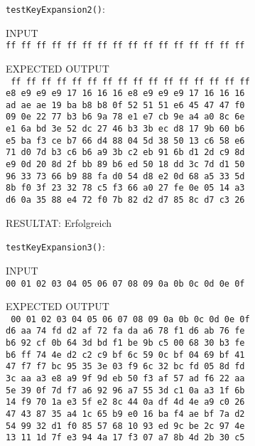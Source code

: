 \documentclass[12pt, letterpaper]{article}
\newcommand{\code}[1]{\texttt{#1}}
\begin{document}
\newpage
\code{testKeyExpansion2()}:

INPUT\\
\code{ff ff ff ff ff ff ff ff ff ff ff ff ff ff ff ff}

EXPECTED OUTPUT\\
\code{
ff ff ff ff ff ff ff ff ff ff ff ff ff ff ff ff\\
e8 e9 e9 e9 17 16 16 16 e8 e9 e9 e9 17 16 16 16\\
ad ae ae 19 ba b8 b8 0f 52 51 51 e6 45 47 47 f0\\
09 0e 22 77 b3 b6 9a 78 e1 e7 cb 9e a4 a0 8c 6e\\
e1 6a bd 3e 52 dc 27 46 b3 3b ec d8 17 9b 60 b6\\
e5 ba f3 ce b7 66 d4 88 04 5d 38 50 13 c6 58 e6\\
71 d0 7d b3 c6 b6 a9 3b c2 eb 91 6b d1 2d c9 8d\\
e9 0d 20 8d 2f bb 89 b6 ed 50 18 dd 3c 7d d1 50\\
96 33 73 66 b9 88 fa d0 54 d8 e2 0d 68 a5 33 5d\\
8b f0 3f 23 32 78 c5 f3 66 a0 27 fe 0e 05 14 a3\\
d6 0a 35 88 e4 72 f0 7b 82 d2 d7 85 8c d7 c3 26
}

RESULTAT: {\color{dgreen}Erfolgreich}

\code{testKeyExpansion3()}:

INPUT\\
\code{00 01 02 03 04 05 06 07 08 09 0a 0b 0c 0d 0e 0f}

EXPECTED OUTPUT\\
\code{
00 01 02 03 04 05 06 07 08 09 0a 0b 0c 0d 0e 0f\\
d6 aa 74 fd d2 af 72 fa da a6 78 f1 d6 ab 76 fe\\
b6 92 cf 0b 64 3d bd f1 be 9b c5 00 68 30 b3 fe\\
b6 ff 74 4e d2 c2 c9 bf 6c 59 0c bf 04 69 bf 41\\
47 f7 f7 bc 95 35 3e 03 f9 6c 32 bc fd 05 8d fd\\
3c aa a3 e8 a9 9f 9d eb 50 f3 af 57 ad f6 22 aa\\
5e 39 0f 7d f7 a6 92 96 a7 55 3d c1 0a a3 1f 6b\\
14 f9 70 1a e3 5f e2 8c 44 0a df 4d 4e a9 c0 26\\
47 43 87 35 a4 1c 65 b9 e0 16 ba f4 ae bf 7a d2\\
54 99 32 d1 f0 85 57 68 10 93 ed 9c be 2c 97 4e\\
13 11 1d 7f e3 94 4a 17 f3 07 a7 8b 4d 2b 30 c5
}
\end{document}
